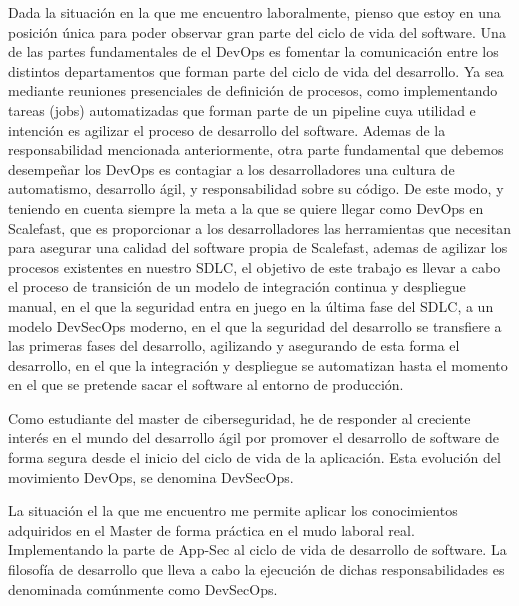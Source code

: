 \documentclass[12pt]{report} %
\begin{document}
Dada la situación en la que me encuentro laboralmente, pienso que estoy en una 
posición única para poder observar gran parte del ciclo de vida del software.
Una de las partes fundamentales de el DevOps es fomentar la comunicación entre
los distintos departamentos que forman parte del ciclo de vida del desarrollo.
Ya sea mediante reuniones presenciales de definición de procesos, como
implementando tareas (jobs) automatizadas que forman parte de un pipeline cuya
utilidad e intención es agilizar el proceso de desarrollo del software.
Ademas de la responsabilidad mencionada anteriormente, otra parte fundamental
que debemos desempeñar los DevOps es contagiar a los desarrolladores una
cultura de automatismo, desarrollo ágil, y responsabilidad sobre su código.  
De este modo, y teniendo en cuenta siempre la meta a la que se quiere llegar
como DevOps en Scalefast, que es proporcionar a los desarrolladores las
herramientas que necesitan para asegurar una calidad del software propia de 
Scalefast, ademas de agilizar los procesos existentes en nuestro \gls{SDLC}, el
objetivo de este trabajo es llevar a cabo el proceso de transición de un
modelo de integración continua y despliegue manual, en el que la seguridad
entra en juego en la última fase del \gls{SDLC}, a un modelo \gls{DevSecOps}
moderno, en el que la seguridad del desarrollo se transfiere a las primeras
fases del desarrollo, agilizando y asegurando de esta forma el desarrollo, en 
el que la integración y despliegue se automatizan hasta el momento en el que se
pretende sacar el software al entorno de producción.

Como estudiante del master de ciberseguridad, he de responder al creciente
interés en el mundo del desarrollo ágil por promover el desarrollo de software
de forma segura desde el inicio del ciclo de vida de la aplicación.
Esta evolución del movimiento DevOps, se denomina DevSecOps.
 
La situación el la que me encuentro me permite aplicar los conocimientos
adquiridos en el Master de forma práctica en el mudo laboral real.
Implementando la parte de \gls{App-Sec} al ciclo de vida de desarrollo de
software.
La filosofía de desarrollo que lleva a cabo la ejecución de dichas
responsabilidades es denominada comúnmente como \gls{DevSecOps}.

\end{document}
